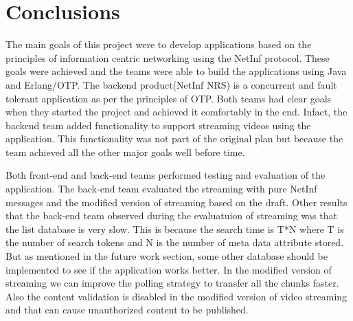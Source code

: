 \section{Conclusions}
The main goals of this project were to develop applications based on the principles of information centric networking using the NetInf protocol. These goals were achieved and the teams were able to build the applications using Java and Erlang/OTP. The backend product(NetInf NRS) is a concurrent and fault tolerant application as per the principles of OTP. Both teams had clear goals when they started the project and achieved it comfortably in the end. Infact, the backend team added functionality to support streaming videos using the application. This functionality was not part of the original plan but because the team achieved all the other major goals well before time.

Both front-end and back-end teams performed testing and evaluation of the application. The back-end team evaluated the streaming with pure NetInf messages and the modified version of streaming based on the draft. Other results that the back-end team observed during the evaluatuion of streaming was that the list database is very slow. This is because the search time is T*N where T is the number of search tokens and N is the number of meta data attribute stored. But as mentioned in the future work section, some other database should be implemented to see if the application works better. In the modified version of streaming we can improve the polling strategy to transfer all the chunks faster. Also the content validation is disabled in the modified version of video streaming and that can cause unauthorized content to be published.     

 
